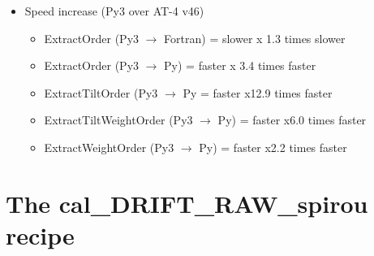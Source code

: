 \begin{itemize}
\begin{itemize}
	\item Speed increase (Py3 over AT-4 v46)
		\begin{itemize}
		\item ExtractOrder (Py3 $\rightarrow$ Fortran) = slower    x 1.3 times slower
		\item ExtractOrder (Py3 $\rightarrow$ Py) = faster     x 3.4 times faster
		\item ExtractTiltOrder (Py3 $\rightarrow$ Py = faster     x12.9 times faster
		\item ExtractTiltWeightOrder (Py3 $\rightarrow$ Py) = faster    x6.0 times faster
		\item ExtractWeightOrder (Py3 $\rightarrow$ Py) = faster    x2.2 times faster
		\end{itemize}

	\end{itemize}

\end{itemize}


\section{The cal\_DRIFT\_RAW\_spirou recipe}
\label{ch:changelog:At4:cal_DRIFT_RAW_spirou}


